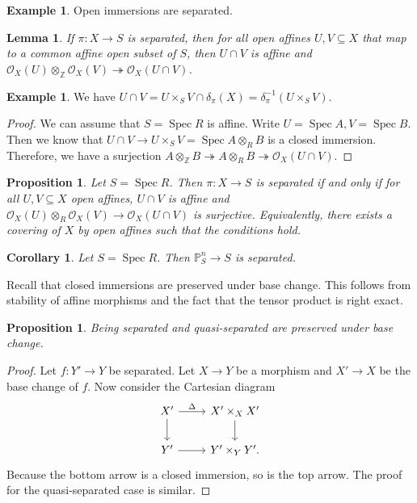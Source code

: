 \documentclass[leqno, openany]{memoir}
\newtheorem{cor}[thm]{Corollary}
\newtheorem{prop}[thm]{Proposition}
\newtheorem{lem}[thm]{Lemma}
\theoremstyle{definition}
\newtheorem{exm}[thm]{Example}
\theoremstyle{remark}
\theoremstyle{plain}
\theoremstyle{definition}
\theoremstyle{remark}
\newcommand{\Z}{\mathbb{Z}}
\renewcommand{\P}{\mathbb{P}}
\newcommand{\mc}[1]{\mathcal{#1}}
\DeclareMathOperator{\Spec}{Spec}
\begin{document}
\begin{exm}
    Open immersions are separated.
\end{exm}

\begin{lem}
    If $\pi \colon X \to S$ is separated, then for all open affines $U, V \subseteq X$ that map to a common affine open subset of $S$, then $U \cap V$ is affine and $\mc{O}_X(U) \otimes_{\Z} \mc{O}_X(V) \twoheadrightarrow \mc{O}_X(U \cap V)$.
\end{lem}

\begin{exm}
    We have $U \cap V = U \times_S V \cap \delta_{\pi}(X) = \delta_{\pi}^{-1}(U \times_S V)$.
\end{exm}

\begin{proof}
    We can assume that $S = \Spec R$ is affine. Write $U = \Spec A, V = \Spec B$. Then we know that $U \cap V \to U \times_S V = \Spec A \otimes_R B$ is a closed immersion. Therefore, we have a surjection $A \otimes_{\Z} B \twoheadrightarrow A \otimes_R B \twoheadrightarrow \mc{O}_X(U \cap V)$.
\end{proof}

\begin{prop}
    Let $S = \Spec R$. Then $\pi \colon X \to S$ is separated if and only if for all $U, V \subseteq X$ open affines, $U \cap V$ is affine and $\mc{O}_X(U) \otimes_R \mc{O}_X(V) \to \mc{O}_X(U \cap V)$ is surjective. Equivalently, there exists a covering of $X$ by open affines such that the conditions hold.
\end{prop}

\begin{cor}
    Let $S = \Spec R$. Then $\P^n_S \to S$ is separated.
\end{cor}

Recall that closed immersions are preserved under base change. This follows from stability of affine morphisms and the fact that the tensor product is right exact. 

\begin{prop}
    Being separated and quasi-separated are preserved under base change. 
\end{prop}

\begin{proof}
    Let $f \colon Y' \to Y$ be separated. Let $X \to Y$ be a morphism and $X' \to X$ be the base change of $f$. Now consider the Cartesian diagram
    \begin{equation*}
    \begin{tikzcd}
        X' \ar{r}{\Delta} \ar{d} & X' \times_X X' \ar{d} \\
        Y' \ar{r} & Y' \times_Y Y'.
    \end{tikzcd}
    \end{equation*}
    Because the bottom arrow is a closed immersion, so is the top arrow. The proof for the quasi-separated case is similar.
\end{proof}
\end{document}
